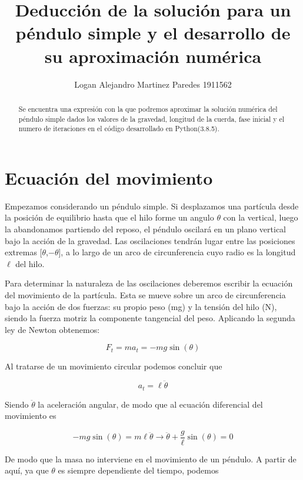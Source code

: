 \documentclass[]{article}
\title{Deducción de la solución para un péndulo simple y el desarrollo de su aproximación numérica}
\author{Logan Alejandro Martinez Paredes 1911562}
\date{}
\begin{document}
	
	\maketitle
		
	\begin{abstract}
		Se encuentra una expresión con la que podremos aproximar la solución numérica del péndulo simple dados los valores de la gravedad, longitud de la cuerda, fase inicial y el numero de iteraciones en el código desarrollado en Python(3.8.5).
	\end{abstract}

	\section{Ecuación del movimiento}
	
	Empezamos considerando un péndulo simple. Si desplazamos una partícula desde la posición de equilibrio hasta que el hilo forme un angulo $\theta$ con la vertical, luego la abandonamos partiendo del reposo, el péndulo oscilará en un plano vertical bajo la acción de la gravedad. Las oscilaciones tendrán lugar entre las posiciones extremas [$\theta$,$-\theta$], a lo largo de un arco de circunferencia cuyo radio es la longitud $\ell$ del hilo.
	
	Para determinar la naturaleza de las oscilaciones deberemos escribir la ecuación del movimiento de la partícula. Esta se mueve sobre un arco de circunferencia bajo la acción de dos fuerzas: su propio peso (mg) y la tensión del hilo (N), siendo la fuerza motriz la componente tangencial del peso. Aplicando la segunda ley de Newton obtenemos:
	
	\begin{equation}
		F_t = ma_t = -mg\sin(\theta)
	\end{equation}

	Al tratarse de un movimiento circular podemos concluir que
	
	\begin{equation}
		a_t = \ell\ddot{\theta}
	\end{equation}
	
	Siendo $\ddot{\theta}$ la aceleración angular, de modo que al ecuación diferencial del movimiento es
	
	\begin{equation}
		-mg\sin(\theta) = m\ell\ddot{\theta} \rightarrow \ddot{\theta}+\frac{g}{\ell}\sin(\theta) = 0
	\end{equation}

	De modo que la masa no interviene en el movimiento de un péndulo. A partir de aquí, ya que $\theta$ es siempre dependiente del tiempo, podemos
	
\end{document}
